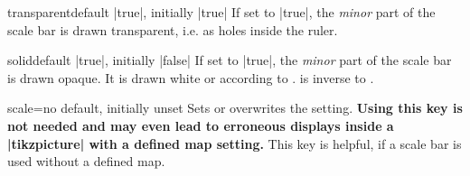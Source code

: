 \begin{docMrcKey}[scalebar]{transparent}{}{default |true|, initially |true|}
  If set to |true|, the \emph{minor} part of the scale bar is drawn transparent,
  i.e. as holes inside the ruler.
\end{docMrcKey}


\begin{docMrcKey}[scalebar]{solid}{}{default |true|, initially |false|}
  If set to |true|, the \emph{minor} part of the scale bar is drawn opaque.
  It is drawn white or according to .
   is inverse to .
\end{docMrcKey}


\begin{docMrcKey}[scalebar]{scale}{=}{no default, initially unset}
  Sets or overwrites the  setting.
  \textbf{Using this key is not needed and may even lead to erroneous displays
    inside a |tikzpicture| with a defined map setting.}
  This key is helpful, if a scale bar is used without a defined map.
\end{docMrcKey}


